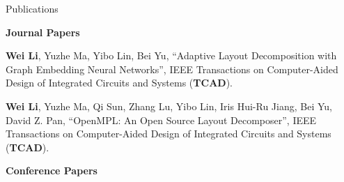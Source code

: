 \begin{rSection}{Publications}


    \textbf{Journal Papers}
    \begin{description}[font=\normalfont]
        \item[{[J2]}]{
            \textbf{Wei Li}, Yuzhe Ma, Yibo Lin, Bei Yu, 
            ``Adaptive Layout Decomposition with Graph Embedding Neural Networks'', IEEE Transactions on Computer-Aided Design of Integrated Circuits and Systems (\textbf{TCAD}).
        }
        \item[{[J1]}]{
            \textbf{Wei Li}, Yuzhe Ma, Qi Sun, Zhang Lu, Yibo Lin, Iris Hui-Ru Jiang, Bei Yu, David Z. Pan,
            ``OpenMPL: An Open Source Layout Decomposer'', IEEE Transactions on Computer-Aided Design of Integrated Circuits and Systems (\textbf{TCAD}).
        }
    \end{description}
\textbf{Conference Papers}
\begin{description}[font=\normalfont]
    

\end{description}
\end{rSection}
